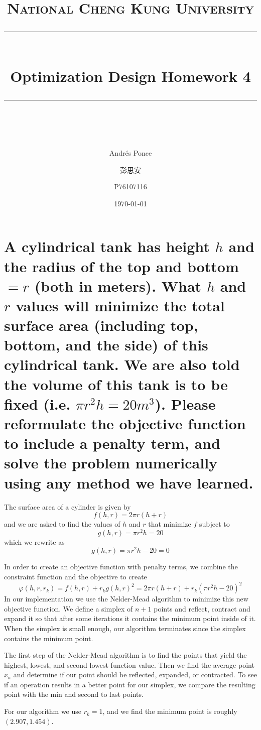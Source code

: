 \documentclass[11pt]{scrartcl}
\title{ 
	\normalfont\normalsize
	\textsc{National Cheng Kung University}\\
	\vspace{25pt}
	\rule{\linewidth}{1pt}\\
	\vspace{20pt}
	{\huge Optimization Design Homework 4}\\
	\vspace{12pt}
	\rule{\linewidth}{2pt}\\
	\vspace{12pt}
}
\author{\Large Andr\'es Ponce \and 彭思安 \and P76107116}
\date{\normalsize\today}
\begin{document}
\maketitle
\section{A cylindrical tank has height $h$ and the radius
of the top and bottom$=r$ (both in meters). What $h$ and $r$
values will minimize the total surface area (including top, bottom, 
and the side) of this cylindrical tank. We are also told the volume
of this tank is to be fixed (i.e. $\pi r^2h=20m^3$). Please
reformulate the objective function to include a penalty term, and solve
the problem numerically using any method we have learned.} 

The surface area of a cylinder is given by 
\begin{equation}
	\label{eq:sarea}
	f(h, r) = 2\pi r(h + r)
\end{equation}
and we are asked to find the values of $h$ and $r$ that minimize $f$ subject to
\[	g(h, r) = \pi r^2h  = 20 \]
which we rewrite as 
\begin{equation}
	\label{eq:constraint}
	g(h, r) = \pi r^2h  -20 = 0
\end{equation}

In order to create an objective function with penalty terms, we combine the 
constraint function and the objective to create 
\begin{equation}
		\label{eq:penalty}
		\varphi(h, r, r_k) = f(h, r) + r_kg(h, r)^2 = 2\pi r(h+r) + r_k(\pi r^2h-20)^2
\end{equation}
In our implementation we use the Nelder-Mead algorithm to minimize this new objective function.
We define a simplex of $n+1$ points and reflect, contract and expand it so that after some iterations
it contains the minimum point inside of it.
When the simplex is small enough, our algorithm terminates since the simplex contains the minimum point.

The first step of the Nelder-Mead algorithm is to find the points that yield the highest, lowest,
and second lowest function value.
Then we find the average point $x_a$ and determine if our point should be reflected, expanded, 
or contracted.
To see if an operation results in a better point for our simplex, we compare the resulting point
with the min and second to last points.

For our algorithm we use $r_k = 1$, and we find the minimum point is roughly $(2.907, 1.454)$.
\end{document}
